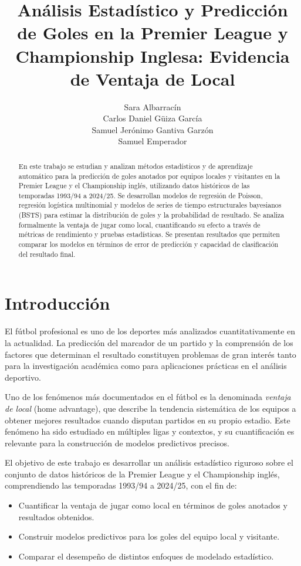 \documentclass[a4paper,12pt]{article}
\title{Análisis Estadístico y Predicción de Goles en la Premier League y Championship Inglesa: Evidencia de Ventaja de Local}
\author{
    Sara Albarracín \\
    Carlos Daniel Güiza García \\
    Samuel Jerónimo Gantiva Garzón \\
    Samuel Emperador
}
\begin{document}
\maketitle

\begin{abstract}
En este trabajo se estudian y analizan métodos estadísticos y de aprendizaje automático para la predicción de goles anotados por equipos locales y visitantes en la Premier League y el Championship inglés, utilizando datos históricos de las temporadas 1993/94 a 2024/25. Se desarrollan modelos de regresión de Poisson, regresión logística multinomial y modelos de series de tiempo estructurales bayesianos (BSTS) para estimar la distribución de goles y la probabilidad de resultado. Se analiza formalmente la ventaja de jugar como local, cuantificando su efecto a través de métricas de rendimiento y pruebas estadísticas. Se presentan resultados que permiten comparar los modelos en términos de error de predicción y capacidad de clasificación del resultado final.
\end{abstract}

\section{Introducción}

El fútbol profesional es uno de los deportes más analizados cuantitativamente en la actualidad. La predicción del marcador de un partido y la comprensión de los factores que determinan el resultado constituyen problemas de gran interés tanto para la investigación académica como para aplicaciones prácticas en el análisis deportivo.

Uno de los fenómenos más documentados en el fútbol es la denominada \textit{ventaja de local} (home advantage), que describe la tendencia sistemática de los equipos a obtener mejores resultados cuando disputan partidos en su propio estadio. Este fenómeno ha sido estudiado en múltiples ligas y contextos, y su cuantificación es relevante para la construcción de modelos predictivos precisos.

El objetivo de este trabajo es desarrollar un análisis estadístico riguroso sobre el conjunto de datos históricos de la Premier League y el Championship inglés, comprendiendo las temporadas 1993/94 a 2024/25, con el fin de:

\begin{itemize}
    \item Cuantificar la ventaja de jugar como local en términos de goles anotados y resultados obtenidos.
    \item Construir modelos predictivos para los goles del equipo local y visitante.
    \item Comparar el desempeño de distintos enfoques de modelado estadístico.
\end{itemize}
\end{document}

